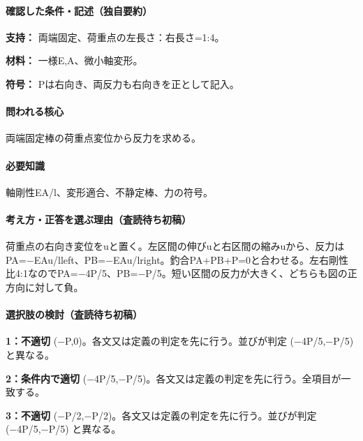 \paragraph{確認した条件・記述（独自要約）}\mbox{}\par

\noindent\textbf{支持：} 両端固定、荷重点の左長さ：右長さ=1:4。\par

\noindent\textbf{材料：} 一様E,A、微小軸変形。\par

\noindent\textbf{符号：} Pは右向き、両反力も右向きを正として記入。\par

\paragraph{問われる核心} 両端固定棒の荷重点変位から反力を求める。

\paragraph{必要知識} 軸剛性EA/l、変形適合、不静定棒、力の符号。

\paragraph{考え方・正答を選ぶ理由（査読待ち初稿）} 荷重点の右向き変位をuと置く。左区間の伸びuと右区間の縮みuから、反力はPA=−EAu/lleft、PB=−EAu/lright。釣合PA+PB+P=\allowbreak{}0と合わせる。左右剛性比4:1なのでPA=−4P/5、PB=−P/5。短い区間の反力が大きく、どちらも図の正方向に対して負。

\paragraph{選択肢の検討（査読待ち初稿）}\mbox{}\par

\noindent\textbf{1：不適切} (−P,0)。各文又は定義の判定を先に行う。並びが判定 (−4P/5,−P/5) と異なる。\par

\noindent\textbf{2：条件内で適切} (−4P/5,−P/5)。各文又は定義の判定を先に行う。全項目が一致する。\par

\noindent\textbf{3：不適切} (−P/2,−P/2)。各文又は定義の判定を先に行う。並びが判定 (−4P/5,−P/5) と異なる。\par

